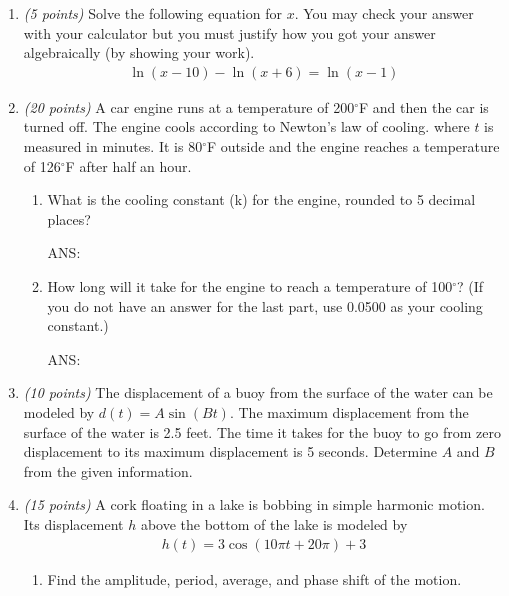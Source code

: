 \documentclass[fleqn]{article}
\renewcommand{\thispagestyle}[1]{}
\begin{document}
\begin{enumerate}

\item \textit{(5 points)} Solve the following equation for $x$.  You may check your answer with your calculator but you must justify how you got your answer algebraically (by showing your work).
\begin{gather*}
\ln(x-10) - \ln(x+6) = \ln(x-1)
\end{gather*}

\vspace{1.5in}

\item \textit{(20 points)} A car engine runs at a temperature of 200$^\circ$F and then the car is turned off. The engine cools according to Newton's law of cooling.
where $t$ is measured in minutes.
It is 80$^\circ$F outside and the engine reaches a temperature of 126$^\circ$F after half an hour.
\begin{enumerate}
\item What is the cooling constant (k) for the engine, rounded to 5 decimal places?

\vspace{1in}
ANS: \underline{\hspace{2in}}

\item How long will it take for the engine to reach a temperature of 100$^\circ$? (If you do not have an answer for the last part, use 0.0500 as your cooling constant.)

\vspace{1in}
ANS: \underline{\hspace{2in}}


\end{enumerate}

\item \textit{(10 points)} The displacement of a buoy from the surface of the water can be modeled by $d(t) = A\sin(Bt)$.  The maximum displacement from the surface of the water is 2.5 feet.  The time it takes for the buoy to go from zero displacement to its maximum displacement is 5 seconds.  Determine $A$ and $B$ from the given information.

\pagebreak
\thispagestyle{fancy}{
\lhead{}
}

\item \textit{(15 points)} A cork floating in a lake is bobbing in simple harmonic motion.
Its displacement $h$ above the bottom of the lake is modeled by
\begin{align*}
h(t) = 3 \cos(10\pi t + 20\pi) + 3
\end{align*}
\begin{enumerate}
\item Find the amplitude, period, average, and phase shift of the motion.


\end{enumerate}
\end{enumerate}
\end{document}

